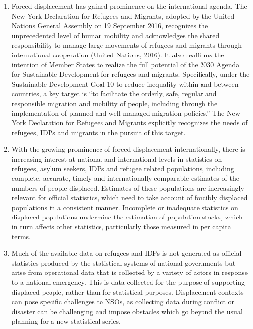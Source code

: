 \documentclass[
]{article}
\begin{document}
\begin{enumerate}
{  a million".} It should be noted that there were more displacements
  associated with natural disasters (17.2 million), than with conflict
  (10.8 million).
\item
  Forced displacement has gained prominence on the international
  agenda. The New York Declaration for Refugees and Migrants, adopted
  by the United Nations General Assembly on 19 September 2016,
  recognizes the unprecedented level of human mobility and
  acknowledges the shared responsibility to manage large movements of
  refugees and migrants through international cooperation (United
  Nations, 2016). It also reaffirms the intention of Member States to
  realize the full potential of the 2030 Agenda for Sustainable
  Development for refugees and migrants. Specifically, under the
  Sustainable Development Goal 10 to reduce inequality within and
  between countries, a key target is ``to facilitate the orderly, safe,
  regular and responsible migration and mobility of people, including
  through the implementation of planned and well-managed migration
  policies.'' The New York Declaration for Refugees and Migrants
  explicitly recognizes the needs of refugees, IDPs and migrants in
  the pursuit of this target.
\item
  With the growing prominence of forced displacement internationally,
  there is increasing interest at national and international levels in
  statistics on refugees, asylum seekers, IDPs and refugee related
  populations, including complete, accurate, timely and
  internationally comparable estimates of the numbers of people
  displaced. Estimates of these populations are increasingly relevant
  for official statistics, which need to take account of forcibly
  displaced populations in a consistent manner. Incomplete or
  inadequate statistics on displaced populations undermine the
  estimation of population stocks, which in turn affects other
  statistics, particularly those measured in per capita terms.
\item
  Much of the available data on refugees and IDPs is not generated as
  official statistics produced by the statistical systems of national
  governments but arise from operational data that is collected by a
  variety of actors in response to a national emergency. This is data
  collected for the purpose of supporting displaced people, rather
  than for statistical purposes. Displacement contexts can pose
  specific challenges to NSOs, as collecting data during conflict or
  disaster can be challenging and impose obstacles which go beyond the
  usual planning for a new statistical series.

\end{enumerate}
\end{document}

